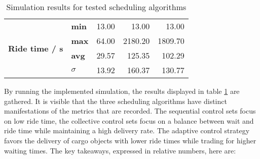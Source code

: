 \begin{table}[]
\begin{tabular}{llrrr}
\multirow{4}{*}{\textbf{Ride time / s}}        & \textbf{min}        & 13.00                                                                                                                                             & 13.00                                                                                                                                             & 13.00                                                                                                                                           \\
                                               & \textbf{max}        & 64.00                                                                                                                                             & 2180.20                                                                                                                                           & 1809.70                                                                                                                                         \\
                                               & \textbf{avg}        & 29.57                                                                                                                                             & 125.35                                                                                                                                            & 102.29                                                                                                                                          \\
                                               & \textbf{$ \sigma $} & 13.92                                                                                                                                             & 160.37                                                                                                                                            & 130.77                                                                                                                                         
\end{tabular}
\caption{\label{tab:impl:simulationresults} Simulation results for tested scheduling algorithms}
\end{table}
\endgroup

By running the implemented simulation, the results displayed in table \ref{tab:impl:simulationresults} are gathered.
It is visible that the three scheduling algorithms have distinct manifestations of the metrics that are recorded.
The sequential control sets focus on low ride time, the collective control sets focus on a balance between wait and ride time while maintaining a high delivery rate. 
The adaptive control strategy favors the delivery of cargo objects with lower ride times while trading for higher waiting times.
The key takeaways, expressed in relative numbers, here are:

